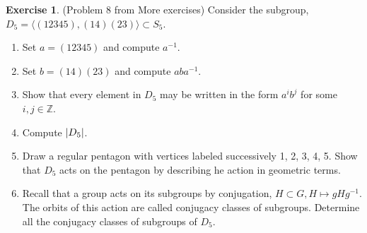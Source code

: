 \documentclass[12pt, psamsfonts]{amsart}
\theoremstyle{definition}
\newtheorem*{exer}{Exercise}
\theoremstyle{remark}
\numberwithin{equation}{section}
\begin{document}
\begin{exer}{(Problem 8 from More exercises)}
  Consider the subgroup, $D_5 = \langle (12345), (14)(23) \rangle \subset S_5$.
  \begin{enumerate}
    \item
      Set $a = (12345)$ and compute $a^{-1}$.
    \item
      Set $b = (14)(23)$ and compute $aba^{-1}$.
    \item
      Show that every element in $D_5$ may be written in the form $a^ib^j$ for some $i, j \in \mathbb{Z}$.
    \item
      Compute $\abs{D_5}$.
    \item
      Draw a regular pentagon with vertices labeled successively 1, 2, 3, 4, 5.
      Show that $D_5$ acts on the pentagon by describing he action in geometric terms.
    \item
      Recall that a group acts on its subgroups by conjugation, $H \subset G, H \mapsto gHg^{-1}$.
      The orbits of this action are called conjugacy classes of subgroups.
      Determine all the conjugacy classes of subgroups of $D_5$.
  \end{enumerate}
\end{exer}
\end{document}
